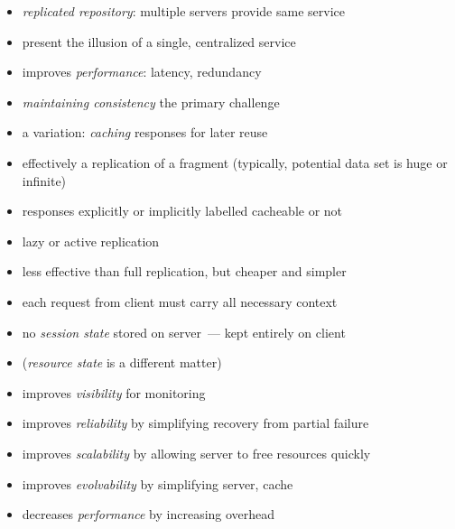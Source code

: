 \documentclass{sepslide-soa-faked} %
\begin{document}
\begin{slide}
\begin{itemize}
\item \emph{replicated repository}: multiple servers provide same service
\item present the illusion of a single, centralized service
\item improves \emph{performance}: latency, redundancy
\item \emph{maintaining consistency} the primary challenge
\bigskip
\item a variation: \emph{caching} responses for later reuse
\item effectively a replication of a fragment
      (typically, potential data set is huge or infinite)
\item responses explicitly or implicitly labelled cacheable or not
\item lazy or active replication
\item less effective than full replication, but cheaper and simpler
\end{itemize}
\end{slide}

\begin{slide}
\begin{itemize}
\item each request from client must carry all necessary context
\item no \emph{session state} stored on server~--- kept entirely on client
\item (\emph{resource state} is a different matter)
\item improves \emph{visibility} for monitoring
\item improves \emph{reliability} by simplifying recovery from partial failure
\item improves \emph{scalability} by allowing server to free resources quickly
\item improves \emph{evolvability} by simplifying server, cache 
\item decreases \emph{performance} by increasing overhead
\end{itemize}
\end{slide}
\end{document}
